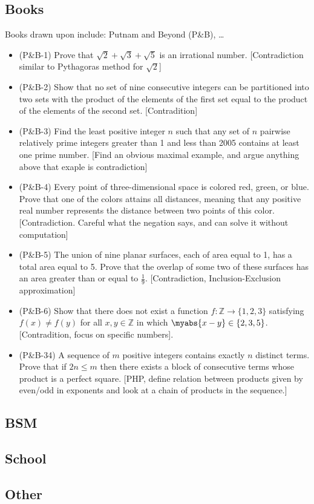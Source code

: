 \documentclass[12pt]{amsart}
\theoremstyle{definition}
\begin{document}
\subsection{Books}
Books drawn upon include: Putnam and Beyond (P\&B), \dots
\begin{itemize}
    \item (P\&B-1) Prove that $\sqrt{2} + \sqrt{3} +\sqrt{5}$ is an
        irrational number. [Contradiction similar to Pythagoras method for
        $\sqrt{2}$] 
    \item (P\&B-2) Show that no set of nine consecutive integers can
        be partitioned into two sets with the product of the elements of
        the first set equal to the product of the elements of the second
        set. [Contradition]
    \item (P\&B-3) Find the least positive integer $n$ such that any set of
        $n$ pairwise relatively prime integers greater than 1 and less than
        2005 contains at least one prime number. [Find an obvious maximal
        example, and argue anything above that exaple is contradiction]
    \item (P\&B-4) Every point of three-dimensional space is colored red,
        green, or blue. Prove that one of the colors attains all distances,
        meaning that any positive real number represents the distance
        between two points of this color. [Contradiction. Careful what the
        negation says, and can solve it without computation]
    \item (P\&B-5) The union of nine planar surfaces, each of area equal to
        1, has a total area equal to 5. Prove that the overlap of some two
        of these surfaces has an area greater than or equal to
        $\frac{1}{9}$.
        [Contradiction, Inclusion-Exclusion approximation]
    \item (P\&B-6) Show that there does not exist a function $f: \mathbb{Z}
        \to \{ 1,2,3\}$ satisfying $f(x) \neq f(y)$ for all $x,y \in
        \mathbb{Z}$ in which $\myabs{x-y} \in \{2,3,5\}$. [Contradition,
        focus on specific numbers].
    \item (P\&B-34) A sequence of $m$ positive integers contains exactly
        $n$ distinct terms. Prove that if $2n \leq m$ then there exists a
        block of consecutive terms whose product is a perfect square. [PHP,
        define relation between products given by even/odd in exponents and
        look at a chain of products in the sequence.]
        
\end{itemize}
\subsection{BSM}
\subsection{School}
\subsection{Other}
\end{document}

